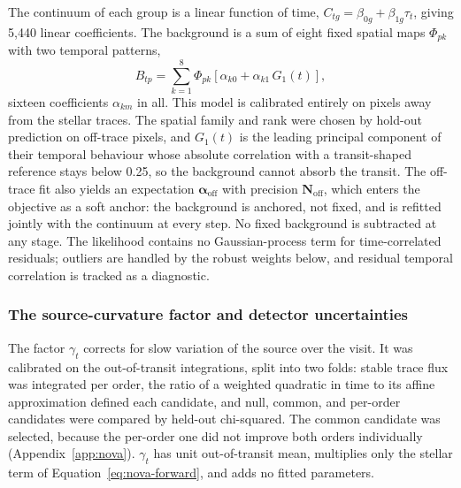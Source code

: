 The continuum of each group is a linear function of time,
$C_{tg}=\beta_{0g}+\beta_{1g}\tau_t$, giving 5{,}440 linear coefficients.
The background is a sum of eight fixed spatial maps $\Phi_{pk}$ with two
temporal patterns,
\begin{equation}
 B_{tp}=\sum_{k=1}^{8}\Phi_{pk}
 \left[\alpha_{k0}+\alpha_{k1}\,G_1(t)\right],
 \label{eq:background-model}
\end{equation}
sixteen coefficients $\alpha_{km}$ in all. This model is calibrated
entirely on pixels away from the stellar traces. The spatial family and
rank were chosen by hold-out prediction on off-trace pixels, and $G_1(t)$
is the leading principal component of their temporal behaviour whose
absolute correlation with a transit-shaped reference stays below 0.25, so
the background cannot absorb the transit. The off-trace fit also yields
an expectation $\bm{\alpha}_{\mathrm{off}}$ with precision
$\bm{N}_{\mathrm{off}}$, which enters the objective as a soft anchor: the
background is anchored, not fixed, and is refitted jointly with the
continuum at every step. No fixed background is subtracted at any stage.
The likelihood contains no Gaussian-process term for time-correlated
residuals; outliers are handled by the robust weights below, and residual
temporal correlation is tracked as a diagnostic.

\subsubsection{The source-curvature factor and detector uncertainties}


The factor $\gamma_t$ corrects for slow variation of the source over the
visit. It was calibrated on the out-of-transit integrations, split into
two folds: stable trace flux was integrated per order, the ratio of a
weighted quadratic in time to its affine approximation defined each
candidate, and null, common, and per-order candidates were compared by
held-out chi-squared. The common candidate was selected, because the
per-order one did not improve both orders individually
(Appendix~\ref{app:nova}). $\gamma_t$ has unit out-of-transit mean,
multiplies only the stellar term of Equation~\ref{eq:nova-forward}, and
adds no fitted parameters.

